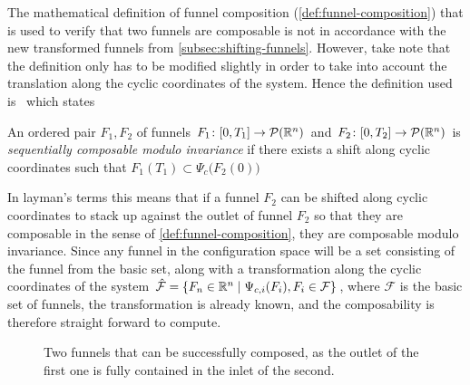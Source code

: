 The mathematical definition of funnel composition
(\cref{def:funnel-composition}) that is used to verify that two funnels are
composable is not in accordance with the new transformed funnels from
\cref{subsec:shifting-funnels}. However, take note that the definition only has
to be modified slightly in order to take into account the translation along the
cyclic coordinates of the system. Hence the definition used
is~\cite[definition~3,sec~5]{majumdarFunnelLibrariesRealtime2017} which states
\begin{definition}
  \label{def:invarant-funnel-composition}
  An ordered pair \(F_1,F_2\) of funnels \(F_1 \colon [0,T_1] \rightarrow
  \mathcal{P}(\mathbb{R}^n)\) and \(F_2 \colon [0,T_2] \rightarrow \mathcal{P}(\mathbb{R}^n)\)
  is \textit{sequentially composable modulo invariance} if there exists a shift
  along cyclic coordinates such that \(F_{1}(T_1) \subset
  \Psi_{c}\bigl(F_2(0)\bigr) \)
\end{definition}
In layman's terms this means that if a funnel \(F_2\) can be shifted along
cyclic coordinates to stack up against the outlet of funnel \(F_2\) so that they
are composable in the sense of \cref{def:funnel-composition}, they are
composable modulo invariance. Since any funnel in the configuration space will
be a set consisting of the funnel from the basic set, along with a
transformation along the cyclic coordinates of the system \(\hat{\mathcal{F}} =
\lbrace F_n \in \mathbb{R}^n \mid \Psi_{c,i}(F_i), F_i \in \mathcal{F}\rbrace\), where
\(\mathcal{F}\) is the basic set of funnels, the transformation is already
known, and the composability is therefore straight forward to compute.

\begin{figure}
  \caption[Two composable funnels]{Two funnels that can be successfully composed, as the outlet of the
    first one is fully contained in the inlet of the second.}
  \label{fig:two-funnels-composed}
\end{figure}

